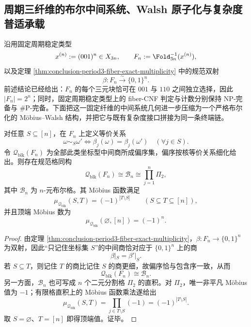 \subsection{周期三纤维的布尔中间系统、Walsh 原子化与复杂度普适承载}\label{subsec:conclusion-period3-fiber-boolean-walsh-universality}
沿用固定周期稳定类型
\[
x^{(n)}:=(001)^n\in X_{3n},
\qquad
F_n:=\Fold_{3n}^{-1}(x^{(n)}),
\]
以及定理 \ref{thm:conclusion-period3-fiber-exact-multiplicity} 中的规范双射
\[
\beta:F_n\stackrel{\sim}{\longrightarrow}\{0,1\}^n.
\]
前述结论已经给出：\(F_n\) 的每个三元块恰可在 \(001\) 与 \(110\) 之间独立选择，因此 \(|F_n|=2^n\)；同时，固定周期稳定类型上的 fiber-CNF 判定与计数分别保持 \(\mathrm{NP}\)-完备与 \(\#\mathrm P\)-完备。下面把这一固定纤维的中间系统几何进一步压缩为一个严格布尔化的 Möbius--Walsh 结构，并把它与既有复杂度接口拼接为同一条终端链。

\begin{theorem}[周期三纤维的坐标中间系统格布尔化]\label{thm:conclusion-period3-fiber-coordinate-lattice-booleanization}
对任意 \(S\subseteq[n]\)，在 \(F_n\) 上定义等价关系
\[
\omega\sim_S\omega'
\iff
\beta_j(\omega)=\beta_j(\omega')\quad(\forall j\in S).
\]
令 \(\mathcal Q_{\mathrm{blk}}(F_n)\) 为全部此类坐标型中间商所成偏序集，偏序按核等价关系细化给出。则存在规范格同构
\[
\mathcal Q_{\mathrm{blk}}(F_n)\cong \mathcal B_n\cong \prod_{j=1}^{n}\Pi_2,
\]
其中 \(\mathcal B_n\) 为 \(n\)-元布尔格。其 Möbius 函数满足
\[
\mu_{\mathcal Q_{\mathrm{blk}}}(S,T)=(-1)^{|T\setminus S|}
\qquad(S\subseteq T\subseteq[n]),
\]
并且顶端 Möbius 数为
\[
\mu_{\mathcal Q_{\mathrm{blk}}}(\varnothing,[n])=(-1)^n.
\]
\end{theorem}
\begin{proof}
由定理 \ref{thm:conclusion-period3-fiber-exact-multiplicity}，\(\beta:F_n\to\{0,1\}^n\) 为双射，因此“只记住坐标集 \(S\)”的中间商恰对应于 \(\{0,1\}^n\) 上的商
\[
\beta|_S=\beta'|_S.
\]
若 \(S\subseteq T\)，则记住 \(T\) 的商比记住 \(S\) 的商更细，故偏序恰与包含序一致，从而
\[
\mathcal Q_{\mathrm{blk}}(F_n)\cong \mathcal B_n.
\]
另一方面，\(\mathcal B_n\) 也可写成 \(n\) 个二元分割格 \(\Pi_2\) 的直积。对 \(\Pi_2\)，唯一非平凡 Möbius 值为 \(-1\)；有限格直积上的 Möbius 函数乘法遂给出
\[
\mu_{\mathcal Q_{\mathrm{blk}}}(S,T)
=
\prod_{j\in T\setminus S}(-1)
=
(-1)^{|T\setminus S|}.
\]
取 \(S=\varnothing\)、\(T=[n]\) 即得顶端值。证毕。
\end{proof}

